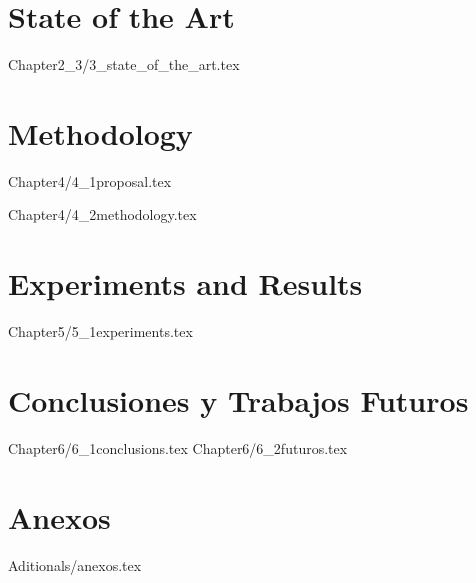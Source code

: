 \documentclass{report}
\begin{document}
\chapter{State of the Art}
{Chapter2_3/3_state_of_the_art.tex}


\chapter{Methodology}
{Chapter4/4_1proposal.tex}

{Chapter4/4_2methodology.tex}





\chapter{Experiments and Results}
 {Chapter5/5_1experiments.tex}



\chapter{Conclusiones y Trabajos Futuros}

{Chapter6/6_1conclusions.tex}
{Chapter6/6_2futuros.tex}








%


% 



\newpage

\chapter*{Anexos}
{Aditionals/anexos.tex}
\end{document}
